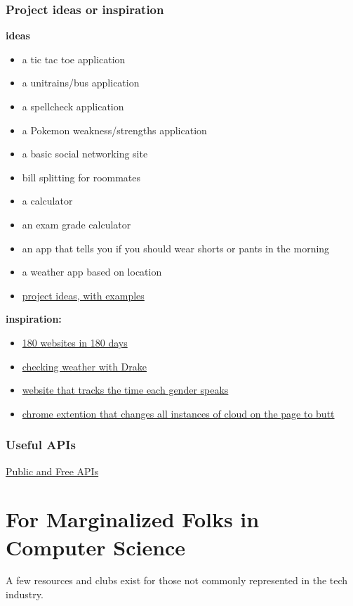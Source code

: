 \documentclass{article}
\begin{document}
\subsubsection{Project ideas or inspiration}
\textbf{ideas}
\begin{itemize}
    \item a tic tac toe application
    \item a unitrains/bus application
    \item a spellcheck application
    \item a Pokemon weakness/strengths application
    \item a basic social networking site
    \item bill splitting for roommates
    \item a calculator
    \item an exam grade calculator 
    \item an app that tells you if you should wear shorts or pants in the morning
    \item a weather app based on location
    \item \href{https://github.com/karan/Projects}{project ideas, with examples}
\end{itemize}
\textbf{inspiration:}
\begin{itemize}
    \item \href{https://jenniferdewalt.com/}{180 websites in 180 days}
    \item \href{http://drakeweather.com/}{checking weather with Drake}
    \item \href{https://github.com/cathydeng/are-men-talking-too-much}{website that tracks the time each gender speaks}
    \item \href{https://github.com/panicsteve/cloud-to-butt}{chrome extention that changes all instances of cloud on the page to butt}
\end{itemize}
\subsubsection{Useful APIs}
\href{https://github.com/toddmotto/public-apis}{Public and Free APIs}
\newpage
\section {For Marginalized Folks in Computer Science}
\hspace{0.5cm} A few resources and clubs exist for those not commonly represented in the tech industry. 
\end{document}
